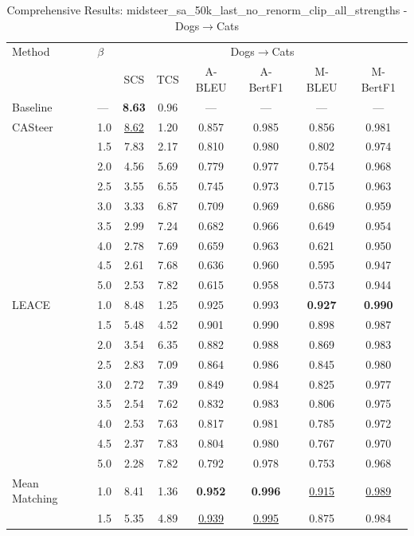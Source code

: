 \begin{table}[htbp]
\centering
\caption{Comprehensive Results: midsteer\_sa\_50k\_last\_no\_renorm\_clip\_all\_strengths - Dogs$\to$Cats}
\label{tab:single_experiment_table_with_clipping_dogs_to_cats}
\begin{tabular}{l|l|cccccc|}
\hline
Method & $\beta$ & \multicolumn{6}{c|}{Dogs$\rightarrow$Cats} \\
 &  & SCS & TCS & A-BLEU & A-BertF1 & M-BLEU & M-BertF1 \\
\hline
Baseline & — & \textbf{8.63} & 0.96 & — & — & — & — \\
\hline
CASteer & 1.0 & \underline{8.62} & 1.20 & 0.857 & 0.985 & 0.856 & 0.981 \\
 & 1.5 & 7.83 & 2.17 & 0.810 & 0.980 & 0.802 & 0.974 \\
 & 2.0 & 4.56 & 5.69 & 0.779 & 0.977 & 0.754 & 0.968 \\
 & 2.5 & 3.55 & 6.55 & 0.745 & 0.973 & 0.715 & 0.963 \\
 & 3.0 & 3.33 & 6.87 & 0.709 & 0.969 & 0.686 & 0.959 \\
 & 3.5 & 2.99 & 7.24 & 0.682 & 0.966 & 0.649 & 0.954 \\
 & 4.0 & 2.78 & 7.69 & 0.659 & 0.963 & 0.621 & 0.950 \\
 & 4.5 & 2.61 & 7.68 & 0.636 & 0.960 & 0.595 & 0.947 \\
 & 5.0 & 2.53 & 7.82 & 0.615 & 0.958 & 0.573 & 0.944 \\
\hline
LEACE & 1.0 & 8.48 & 1.25 & 0.925 & 0.993 & \textbf{0.927} & \textbf{0.990} \\
 & 1.5 & 5.48 & 4.52 & 0.901 & 0.990 & 0.898 & 0.987 \\
 & 2.0 & 3.54 & 6.35 & 0.882 & 0.988 & 0.869 & 0.983 \\
 & 2.5 & 2.83 & 7.09 & 0.864 & 0.986 & 0.845 & 0.980 \\
 & 3.0 & 2.72 & 7.39 & 0.849 & 0.984 & 0.825 & 0.977 \\
 & 3.5 & 2.54 & 7.62 & 0.832 & 0.983 & 0.806 & 0.975 \\
 & 4.0 & 2.53 & 7.63 & 0.817 & 0.981 & 0.785 & 0.972 \\
 & 4.5 & 2.37 & 7.83 & 0.804 & 0.980 & 0.767 & 0.970 \\
 & 5.0 & 2.28 & 7.82 & 0.792 & 0.978 & 0.753 & 0.968 \\
\hline
Mean Matching & 1.0 & 8.41 & 1.36 & \textbf{0.952} & \textbf{0.996} & \underline{0.915} & \underline{0.989} \\
 & 1.5 & 5.35 & 4.89 & \underline{0.939} & \underline{0.995} & 0.875 & 0.984 \\

\end{tabular}
\end{table}
